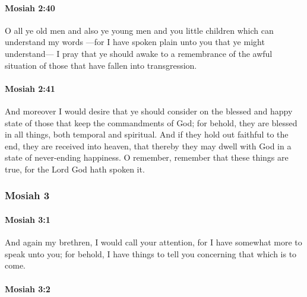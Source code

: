 		\paragraph{Mosiah 2:40} %
			\label{MOSIAH-2-40}

			O all ye old men and also ye young men
			and you little children which can understand my words
			---for I have spoken plain unto you that ye might understand---
			I pray that ye should awake to a remembrance of the awful situation
			of those that have fallen into transgression.

		\paragraph{Mosiah 2:41} %
			\label{MOSIAH-2-41}

			And moreover I would desire
			that ye should consider on the blessed and happy state
			of those that keep the commandments of God;
			for behold, they are blessed in all things, both temporal and spiritual.
			And if they hold out faithful to the end,
			they are received into heaven,
			that thereby they may dwell with God in a state of never-ending happiness.
			O remember, remember that these things are true,
			for the Lord God hath spoken it.
			
	\subsubsection{Mosiah 3} %
		\label{MOSIAH-3}
		
		\paragraph{Mosiah 3:1} %
			\label{MOSIAH-3-1}

			And again my brethren, I would call your attention,
			for I have somewhat more to speak unto you;
			for behold, I have things to tell you concerning that which is to come.

		\paragraph{Mosiah 3:2} %
			\label{MOSIAH-3-2}

